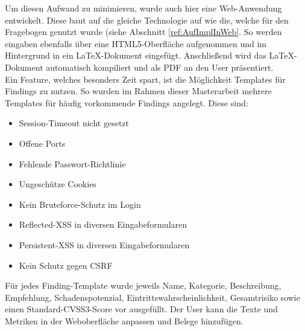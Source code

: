 	Um diesen Aufwand zu minimieren, wurde auch hier eine Web-Anwendung entwickelt. Diese baut auf die gleiche Technologie auf wie die, welche für den Fragebogen genutzt wurde (siehe Abschnitt \ref{ref:AufImplInWeb}. So werden eingaben ebenfalls über eine HTML5-Oberfläche aufgenommen und im Hintergrund in ein LaTeX-Dokument eingefügt. Anschließend wird das LaTeX-Dokument automatisch kompiliert und als PDF an den User präsentiert.\\
	
	Ein Feature, welches besonders Zeit spart, ist die Möglichkeit Templates für Findings zu nutzen. So wurden im Rahmen dieser Masterarbeit mehrere Templates für häufig vorkommende Findings angelegt. Diese sind:
	\begin{itemize}
		\item Session-Timeout nicht gesetzt
		\item Offene Ports
		\item Fehlende Passwort-Richtlinie
		\item Ungeschütze Cookies
		\item Kein Bruteforce-Schutz im Login
		\item Reflected-XSS in diversen Eingabeformularen
		\item Persistent-XSS in diversen Eingabeformularen
		\item Kein Schutz gegen CSRF
	\end{itemize}
	
	Für jedes Finding-Template wurde jeweils Name, Kategorie, Beschreibung, Empfehlung, Schadenspotenzial, Eintrittswahrscheinlichkeit, Gesamtrisiko sowie einen Standard-CVSS3-Score vor ausgefüllt. Der User kann die Texte und Metriken in der Weboberfläche anpassen und Belege hinzufügen.
	
